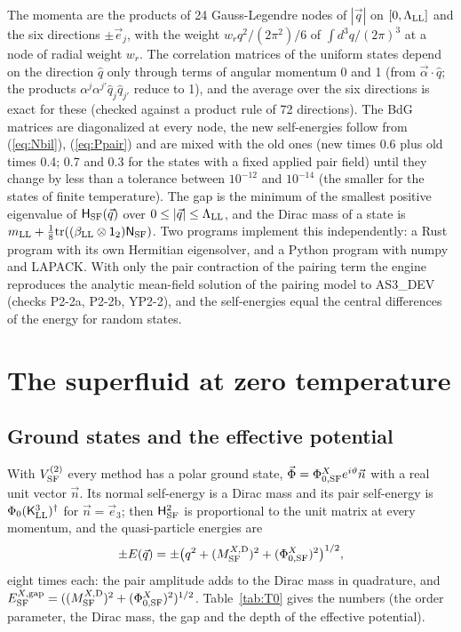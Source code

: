 \documentclass[aps,prd,onecolumn,superscriptaddress,nofootinbib,floatfix,longbibliography]{revtex4-2}
\newcommand{\LL}{{\rm LL}}
\newcommand{\SF}{{\rm SF}}
\newcommand{\tr}{\mathrm{tr}}
\begin{document}
The momenta are the products of 24 Gauss-Legendre nodes of $|\vec q|$ on $[0,\Lambda_\LL]$ and the six directions $\pm\vec e_j$,
with the weight $w_rq^2/(2\pi^2)/6$ of $\int d^3q/(2\pi)^3$ at a node of radial weight $w_r$. The correlation matrices of the
uniform states depend on the direction $\hat q$ only through terms of angular momentum 0 and 1 (from $\vec\alpha\cdot\hat q$; the
products $\alpha^j\alpha^{j'}\hat q_j\hat q_{j'}$ reduce to 1), and the average over the six directions is exact for these (checked
against a product rule of 72 directions). The BdG matrices are diagonalized at every node, the new self-energies follow
from (\ref{eq:Nbil}), (\ref{eq:Ppair}) and are mixed with the old ones (new times 0.6 plus old times 0.4; 0.7 and 0.3 for the states with a fixed applied pair field) until they change by
less than a tolerance between $10^{-12}$ and $10^{-14}$ (the smaller for the states of finite temperature). The gap is the minimum of the smallest positive eigenvalue of $\mathsf H_\SF(\vec q)$ over
$0\le|\vec q|\le\Lambda_\LL$, and the Dirac mass of a state is $m_\LL+\frac18\tr((\beta_\LL\otimes\mathsf 1_2)\mathsf N_\SF)$. Two programs
implement this independently: a Rust program with its own Hermitian eigensolver, and a Python program with numpy and LAPACK.
With only the pair contraction of the pairing term the engine reproduces the analytic mean-field solution of the pairing
model to {{AS3_DEV}} (checks P2-2a, P2-2b, YP2-2), and the self-energies equal the central differences of the energy for random states.

\section{The superfluid at zero temperature}
\label{sec:T0}

\subsection{Ground states and the effective potential}

With $V^{(2)}_\SF$ every method has a polar ground state, $\vec\Phi=\Phi^X_{0,\SF}e^{i\vartheta}\vec n$ with a real unit vector $\vec n$.
Its normal self-energy is a Dirac mass and its pair self-energy is $\Phi_0(\mathsf K^3_\LL)^\dagger$ for $\vec n=\vec e_3$; then
$\mathsf H_\SF^2$ is proportional to the unit matrix at every momentum, and the quasi-particle energies are
\begin{equation}
\pm E(\vec q)=\pm\big(q^2+(M^{X,{\rm D}}_\SF)^2+(\Phi^X_{0,\SF})^2\big)^{1/2},
\label{eq:qp}
\end{equation}
eight times each: the pair amplitude adds to the Dirac mass in quadrature, and $E^{X,{\rm gap}}_\SF=((M^{X,{\rm D}}_\SF)^2+(\Phi^X_{0,\SF})^2)^{1/2}$.
Table~\ref{tab:T0} gives the numbers (the order parameter, the Dirac mass, the gap and the depth of the effective potential).
\end{document}
